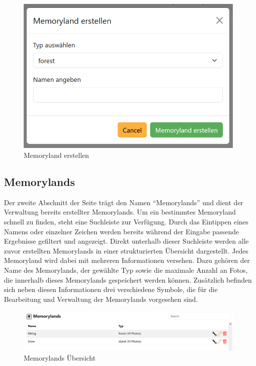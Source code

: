 \begin{figure}
    \centering
    \includegraphics[scale=0.5]{pics/all_worlds_teil1_button.PNG}
    \caption{Memoryland erstellen}
    \label{fig:all-worlds-memoryland-erstellen}
\end{figure}

\subsection{Memorylands}

Der zweite Abschnitt der Seite trägt den Namen ``Memorylands'' und dient der 
Verwaltung bereits erstellter Memorylands. Um ein bestimmtes Memoryland schnell 
zu finden, steht eine Suchleiste zur Verfügung. Durch das Eintippen eines Namens 
oder einzelner Zeichen werden bereits während der Eingabe passende Ergebnisse 
gefiltert und angezeigt. Direkt unterhalb dieser Suchleiste werden alle zuvor 
erstellten Memorylands in einer strukturierten Übersicht dargestellt. Jedes 
Memoryland wird dabei mit mehreren Informationen versehen. Dazu gehören der 
Name des Memorylands, der gewählte Typ sowie die maximale Anzahl an Fotos, die 
innerhalb dieses Memorylands gespeichert werden können. Zusätzlich befinden sich 
neben diesen Informationen drei verschiedene Symbole, die für die Bearbeitung und 
Verwaltung der Memorylands vorgesehen sind.

\begin{figure} [h t]
    \centering
    \includegraphics[scale=0.6]{pics/all_worlds_teil2.PNG}
    \caption{Memorylands Übersicht}
    \label{fig:all-worlds-memorylands}
\end{figure}


